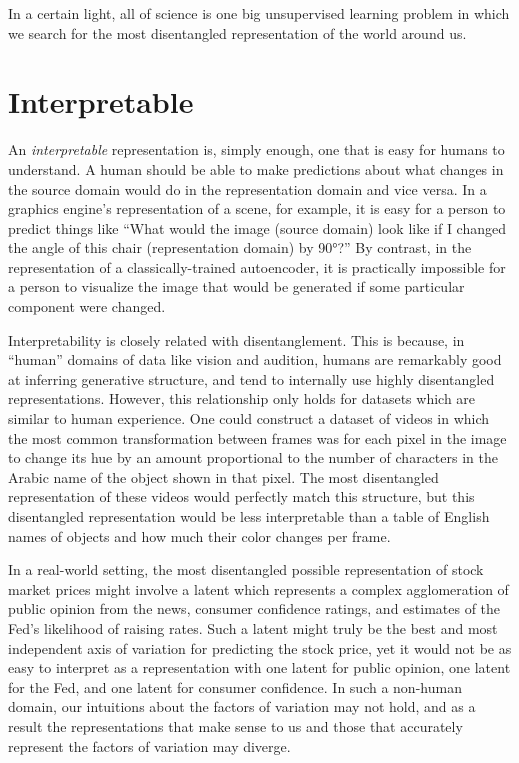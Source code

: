\documentclass[12pt,twoside]{mitthesis}
\begin{document}
In a certain light, all of science is one big unsupervised learning
problem in which we search for the most disentangled representation of
the world around us.

\section{Interpretable}\label{interpretable}

An \emph{interpretable} representation is, simply enough, one that is
easy for humans to understand. A human should be able to make
predictions about what changes in the source domain would do in the
representation domain and vice versa. In a graphics engine's
representation of a scene, for example, it is easy for a person to
predict things like ``What would the image (source domain) look like if
I changed the angle of this chair (representation domain) by 90°?'' By
contrast, in the representation of a classically-trained autoencoder, it
is practically impossible for a person to visualize the image that would
be generated if some particular component were changed.

Interpretability is closely related with disentanglement. This is
because, in ``human'' domains of data like vision and audition, humans
are remarkably good at inferring generative structure, and tend to
internally use highly disentangled representations. However, this
relationship only holds for datasets which are similar to human
experience. One could construct a dataset of videos in which the most
common transformation between frames was for each pixel in the image to
change its hue by an amount proportional to the number of characters in
the Arabic name of the object shown in that pixel. The most disentangled
representation of these videos would perfectly match this structure, but
this disentangled representation would be less interpretable than a
table of English names of objects and how much their color changes per
frame.

In a real-world setting, the most disentangled possible representation
of stock market prices might involve a latent which represents a complex
agglomeration of public opinion from the news, consumer confidence
ratings, and estimates of the Fed's likelihood of raising rates. Such a
latent might truly be the best and most independent axis of variation
for predicting the stock price, yet it would not be as easy to interpret
as a representation with one latent for public opinion, one latent for
the Fed, and one latent for consumer confidence. In such a non-human
domain, our intuitions about the factors of variation may not hold, and
as a result the representations that make sense to us and those that
accurately represent the factors of variation may diverge.
\end{document}
